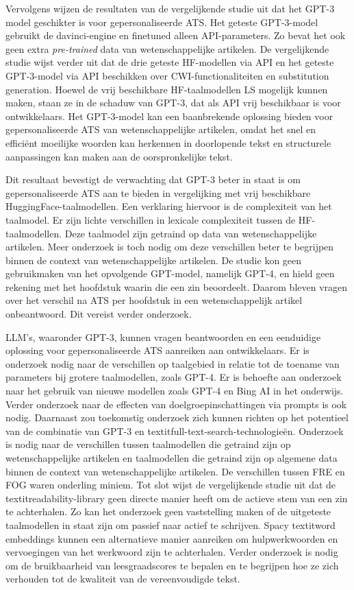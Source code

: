 Vervolgens wijzen de resultaten van de vergelijkende studie uit dat het GPT-3 model geschikter is voor gepersonaliseerde ATS. Het geteste GPT-3-model gebruikt de davinci-engine en finetuned alleen API-parameters. Zo bevat het ook geen extra \textit{pre-trained} data van wetenschappelijke artikelen. De vergelijkende studie wijst verder uit dat de drie geteste HF-modellen via API en het geteste GPT-3-model via API beschikken over CWI-functionaliteiten en substitution generation. Hoewel de vrij beschikbare HF-taalmodellen LS mogelijk kunnen maken, staan ze in de schaduw van GPT-3, dat als API vrij beschikbaar is voor ontwikkelaars. Het GPT-3-model kan een baanbrekende oplossing bieden voor gepersonaliseerde ATS van wetenschappelijke artikelen, omdat het snel en efficiënt moeilijke woorden kan herkennen in doorlopende tekst en structurele aanpassingen kan maken aan de oorspronkelijke tekst.

\medspace

Dit resultaat bevestigt de verwachting dat GPT-3 beter in staat is om gepersonaliseerde ATS aan te bieden in vergelijking met vrij beschikbare HuggingFace-taalmodellen. Een verklaring hiervoor is de complexiteit van het taalmodel. Er zijn lichte verschillen in lexicale complexiteit tussen de HF-taalmodellen. Deze taalmodel zijn getraind op data van wetenschappelijke artikelen. Meer onderzoek is toch nodig om deze verschillen beter te begrijpen binnen de context van wetenschappelijke artikelen. De studie kon geen gebruikmaken van het opvolgende GPT-model, namelijk GPT-4, en hield geen rekening met het hoofdstuk waarin die een zin beoordeelt. Daarom bleven vragen over het verschil na ATS per hoofdstuk in een wetenschappelijk artikel onbeantwoord. Dit vereist verder onderzoek.

\medspace

LLM's, waaronder GPT-3, kunnen vragen beantwoorden en een eenduidige oplossing voor gepersonaliseerde ATS aanreiken aan ontwikkelaars. Er is onderzoek nodig naar de verschillen op taalgebied in relatie tot de toename van parameters bij grotere taalmodellen, zoals GPT-4. Er is behoefte aan onderzoek naar het gebruik van nieuwe modellen zoals GPT-4 en Bing AI in het onderwijs. Verder onderzoek naar de effecten van doelgroepinschattingen via prompts is ook nodig. Daarnaast zou toekomstig onderzoek zich kunnen richten op het potentieel van de combinatie van GPT-3 en textit{full-text-search}-technologieën. Onderzoek is nodig naar de verschillen tussen taalmodellen die getraind zijn op wetenschappelijke artikelen en taalmodellen die getraind zijn op algemene data binnen de context van wetenschappelijke artikelen. De verschillen tussen FRE en FOG waren onderling miniem. Tot slot wijst de vergelijkende studie uit dat de textit{readability}-library geen directe manier heeft om de actieve stem van een zin te achterhalen. Zo kan het onderzoek geen vaststelling maken of de uitgeteste taalmodellen in staat zijn om passief naar actief te schrijven. Spacy textit{word embeddings} kunnen een alternatieve manier aanreiken om hulpwerkwoorden en vervoegingen van het werkwoord zijn te achterhalen. Verder onderzoek is nodig om de bruikbaarheid van leesgraadscores te bepalen en te begrijpen hoe ze zich verhouden tot de kwaliteit van de vereenvoudigde tekst.


